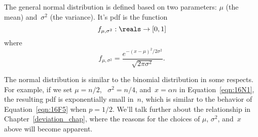 The general normal distribution is defined based on two parameters:
$\mu$ (the mean) and~$\sigma^2$ (the variance).  It's pdf is the
function
\begin{equation*}
    f_{\mu, \sigma^2} : \reals \to [0, 1]
\end{equation*}
where
\begin{equation}\label{eqn:16N1}
    f_{\mu, \sigma^2} = \frac{ e^{ - (x - \mu)^2 / 2 \sigma^2 } }
                             { \sqrt{2 \pi \sigma^2 } }.
\end{equation}

The normal distribution is similar to the binomial distribution in
some respects.  For example, if we set $\mu = n/2$, \ $\sigma^2 =
n/4$, and~$x = \alpha n$ in Equation~\ref{eqn:16N1}, the resulting pdf
is exponentially small in~$n$, which is similar to the behavior of
Equation~\ref{eqn:16F5} when $p = 1/2$.  We'll talk further about the
relationship in Chapter~\ref{deviation_chap}, where the reasons for
the choices of $\mu$, $\sigma^2$, and~$x$ above will become apparent.

\endinput
